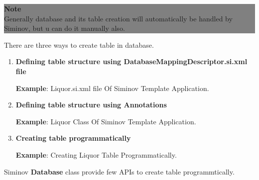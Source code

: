 			\begin{center}
				\colorbox{grey}{
				\parbox[t]{.8\linewidth}{
					\fontsize{11pt}{11pt}\selectfont %
					\vspace*{0.1cm} %

					\hfill \textbf{Note} \\
					Generally database and its table creation will automatically be handled by Siminov, but u can do it manually also.

					\vspace*{0.0cm} %
					}
			}

			\end{center}


		\par
		There are three ways to create table in database.

		\begin{enumerate}

			\item \small \textbf{Defining table structure using DatabaseMappingDescriptor.si.xml file}

				\textbf{Example}: Liquor.si.xml file Of Siminov Template Application.
				
		
			\item \small \textbf{Defining table structure using Annotations}

				\textbf{Example}: Liquor Class Of Siminov Template Application.
				

			\item \small \textbf{Creating table programmatically}

				\textbf{Example}: Creating Liquor Table Programmatically.
				

		\end{enumerate}


		\par
		 Siminov \textbf{Database} class provide few APIs to create table programmtically.

